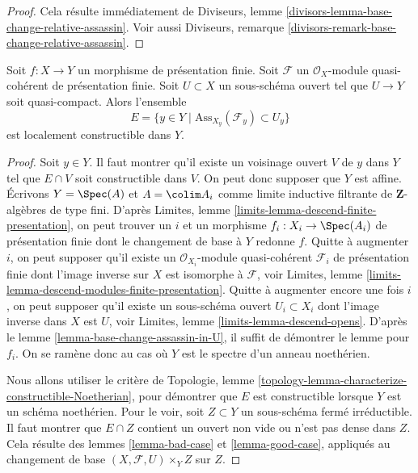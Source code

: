\begin{proof}
Cela résulte immédiatement de
Diviseurs, lemme \ref{divisors-lemma-base-change-relative-assassin}.
Voir aussi
Diviseurs, remarque \ref{divisors-remark-base-change-relative-assassin}.
\end{proof}

\begin{lemma}
\label{lemma-relative-assassin-constructible}
Soit $f : X \to Y$ un morphisme de présentation finie.
Soit $\mathcal{F}$ un $\mathcal{O}_X$-module quasi-cohérent
de présentation finie. Soit $U \subset X$ un sous-schéma ouvert
tel que $U \to Y$ soit quasi-compact. Alors l'ensemble
$$
E = \{y \in Y \mid \text{Ass}_{X_y}(\mathcal{F}_y) \subset U_y\}
$$
est localement constructible dans $Y$.
\end{lemma}

\begin{proof}
Soit $y \in Y$. Il faut montrer qu'il existe un voisinage ouvert
$V$ de $y$ dans $Y$ tel que $E \cap V$ soit constructible dans $V$. On peut donc
supposer que $Y$ est affine. Écrivons $Y = \Spec(A)$ et
$A = \colim A_i$ comme limite inductive filtrante de
$\mathbf{Z}$-algèbres de type fini. D'après
Limites, lemme \ref{limits-lemma-descend-finite-presentation},
on peut trouver un $i$ et un morphisme $f_i : X_i \to \Spec(A_i)$ de
présentation finie dont le changement de base à $Y$ redonne $f$.
Quitte à augmenter $i$, on peut supposer qu'il existe un
$\mathcal{O}_{X_i}$-module quasi-cohérent $\mathcal{F}_i$ de présentation
finie dont l'image inverse sur $X$ est isomorphe à $\mathcal{F}$, voir
Limites, lemme \ref{limits-lemma-descend-modules-finite-presentation}.
Quitte à augmenter encore une fois $i$, on peut supposer qu'il existe
un sous-schéma ouvert $U_i \subset X_i$ dont l'image inverse dans $X$
est $U$, voir
Limites, lemme \ref{limits-lemma-descend-opens}.
D'après le
lemme \ref{lemma-base-change-assassin-in-U},
il suffit de démontrer le lemme pour $f_i$. On se ramène donc au
cas où $Y$ est le spectre d'un anneau noethérien.

\medskip\noindent
Nous allons utiliser le critère de
Topologie, lemme \ref{topology-lemma-characterize-constructible-Noetherian},
pour démontrer que $E$ est constructible lorsque $Y$ est un schéma noethérien.
Pour le voir, soit $Z \subset Y$ un sous-schéma fermé irréductible.
Il faut montrer que $E \cap Z$ contient un ouvert non vide
ou n'est pas dense dans $Z$. Cela résulte des
lemmes \ref{lemma-bad-case} et
\ref{lemma-good-case},
appliqués au changement de base $(X, \mathcal{F}, U) \times_Y Z$ sur $Z$.
\end{proof}

